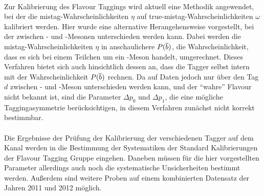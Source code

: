 \\
Zur Kalibrierung des Flavour Taggings wird aktuell eine Methodik angewendet, bei der die mistag-Wahrscheinlichkeiten $\eta$ auf true-mistag-Wahrscheinlichkeiten $\omega$ kalibriert werden. Hier wurde eine alternative Herangehensweise vorgestellt, bei der zwischen \Bz- und \Bzb-Mesonen unterschieden werden kann. Dabei werden die mistag-Wahrscheinlichkeiten $\eta$ in anschaulichere $P({\overline {{b}}})$, die Wahrscheinlichkeit, dass es sich bei einem Teilchen um ein \Bz-Meson handelt, umgerechnet. Dieses Verfahren bietet sich auch hinsichtlich dessen an, dass die Tagger selbst intern mit der Wahrscheinlichkeit $P({\overline {{b}}})$ rechnen. Da auf Daten jedoch nur über den Tag $d$ zwischen \Bz- und \Bzb-Meson unterschieden werden kann, und der \enquote{wahre} Flavour nicht bekannt ist, sind die Parameter $\Delta p_0$ und $\Delta p_1$, die eine mögliche Taggingasymmetrie berücksichtigen, in diesem Verfahren zunächst nicht korrekt bestimmbar.\\
\\
Die Ergebnisse der Prüfung der Kalibrierung der verschiedenen Tagger auf dem Kanal \BdToDpi werden in die Bestimmung der Systematiken der Standard Kalibrierungen der Flavour Tagging Gruppe eingehen. Daneben müssen für die hier vorgestellten Parameter allerdings auch noch die systematische Unsicherheiten bestimmt werden. Außerdem sind weitere Proben auf einem kombinierten Datensatz der Jahren \num{2011} und \num{2012} möglich. 